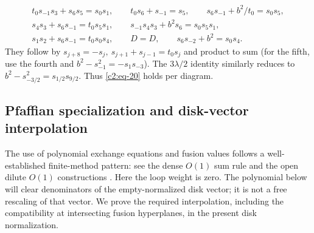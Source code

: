 \[
\begin{array}{l}
t_0s_{-1}s_3+s_6s_5=s_0s_1,\qquad t_0s_6+s_{-1}=s_5,\qquad s_6s_{-1}+b^2/t_0=s_0s_5,\\
s_4s_3+s_6s_{-1}=t_0s_5s_1,\qquad s_{-1}s_4s_3+b^2s_6=s_0s_5s_1,\\
s_1s_2+s_6s_{-1}=t_0s_0s_4,\qquad D=D,\qquad s_6s_{-2}+b^2=s_0s_4 .
\end{array}
\]
They follow by \(s_{j+8}=-s_j,\ s_{j+1}+s_{j-1}=t_0s_j\) and product to sum (for the fifth, use the fourth and \(b^2-s_{-1}^2=-s_1s_{-3}\)). The \(3\lambda/2\) identity similarly reduces to \(b^2-s_{-3/2}^2=s_{1/2}s_{9/2}\). Thus \eqref{c2:eq-20} holds per diagram.

\subsection{Pfaffian specialization and disk-vector interpolation}
\label{c2:sec-pfaffian-interpolation}

The use of polynomial exchange equations and fusion values follows a
well-established finite-method pattern: see the dense $O(1)$ sum rule
\cite{DiFrancescoZinnJustin2005} and the open dilute $O(1)$ constructions
\cite{GarbaliNienhuis2017Ground,GarbaliNienhuis2017Sum}.  Here the loop
weight is zero. The polynomial below will clear denominators of the
empty-normalized disk vector; it is not a free rescaling of that vector.
We prove the required interpolation, including the
compatibility at intersecting fusion hyperplanes, in the present disk
normalization.

